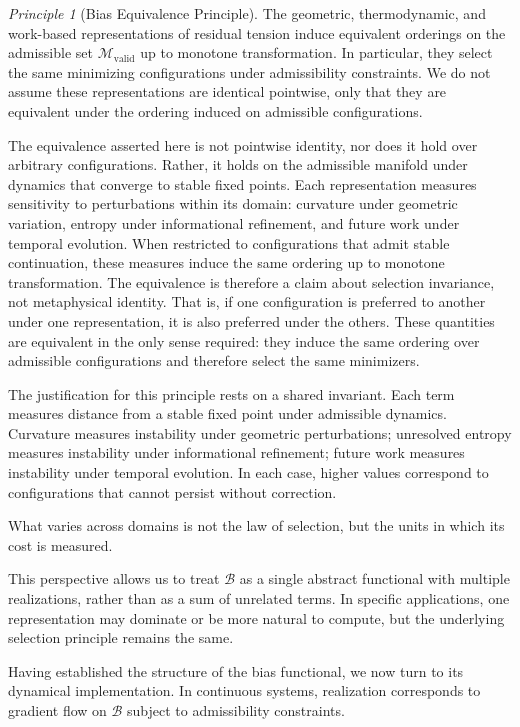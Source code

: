\documentclass[11pt]{article}
\theoremstyle{plain}
\theoremstyle{definition}
\theoremstyle{remark}
\newtheorem{principle}[theorem]{Principle}
\begin{document}
\begin{principle}[Bias Equivalence Principle]
The geometric, thermodynamic, and work-based representations of residual tension induce equivalent orderings on the admissible set $\mathcal{M}_{\mathrm{valid}}$ up to monotone transformation. In particular, they select the same minimizing configurations under admissibility constraints. We do not assume these representations are identical pointwise, only that they are equivalent under the ordering induced on admissible configurations.
\end{principle}

The equivalence asserted here is not pointwise identity, nor does it hold over arbitrary configurations. Rather, it holds on the admissible manifold under dynamics that converge to stable fixed points. Each representation measures sensitivity to perturbations within its domain: curvature under geometric variation, entropy under informational refinement, and future work under temporal evolution. When restricted to configurations that admit stable continuation, these measures induce the same ordering up to monotone transformation. The equivalence is therefore a claim about selection invariance, not metaphysical identity. That is, if one configuration is preferred to another under one representation, it is also preferred under the others. These quantities are equivalent in the only sense required: they induce the same ordering over admissible configurations and therefore select the same minimizers.

The justification for this principle rests on a shared invariant. Each term measures distance from a stable fixed point under admissible dynamics. Curvature measures instability under geometric perturbations; unresolved entropy measures instability under informational refinement; future work measures instability under temporal evolution. In each case, higher values correspond to configurations that cannot persist without correction.

What varies across domains is not the law of selection, but the units in which its cost is measured.

This perspective allows us to treat $\mathcal{B}$ as a single abstract functional with multiple realizations, rather than as a sum of unrelated terms. In specific applications, one representation may dominate or be more natural to compute, but the underlying selection principle remains the same.

Having established the structure of the bias functional, we now turn to its dynamical implementation. In continuous systems, realization corresponds to gradient flow on $\mathcal{B}$ subject to admissibility constraints.
\end{document}
